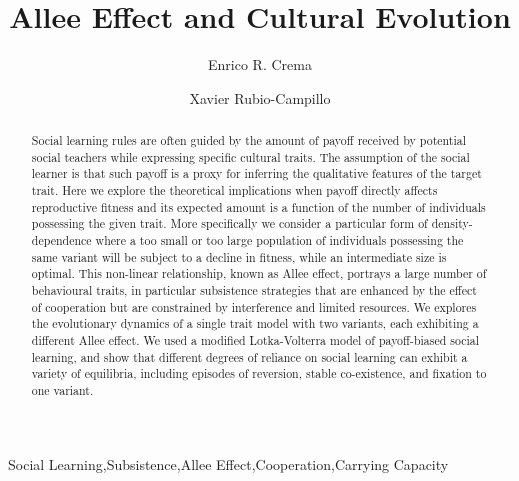 \documentclass[3p,authoryear,twocolumn]{elsarticle} %
\begin{document}
\begin{frontmatter}

\title{Allee Effect and Cultural Evolution}


\author[label1,label2]{Enrico R. Crema}
\author[label3]{Xavier Rubio-Campillo}

\address[label1]{CaSEs - Complexity and Socio-Ecological Dynamics Research Group, Barcelona}
\address[label2]{UCL Institute of Archaeology}
\address[label3]{BSC - Barcelona Supercomputing Center}



\begin{abstract}
Social learning rules are often guided by the amount of payoff received by potential social teachers while expressing specific cultural traits. The assumption of the social learner is that such payoff is a proxy for inferring the qualitative features of the target trait. Here we explore the theoretical implications when payoff directly affects  reproductive fitness and its expected amount is a function of the number of individuals possessing the given trait. More specifically we consider a particular form of density-dependence where a too small or too large population of individuals possessing the same variant will be subject to a decline in fitness, while an intermediate size is optimal. This non-linear relationship, known as Allee effect, portrays a large number of behavioural traits, in particular subsistence strategies that are enhanced  by the effect of cooperation but are constrained by interference and limited resources. We  explores the evolutionary dynamics of a single trait model  with two variants, each exhibiting a different Allee effect. We used a modified Lotka-Volterra model of payoff-biased social learning, and show that different degrees of reliance on social learning can exhibit a variety of equilibria, including episodes of reversion, stable co-existence, and fixation to one variant.


\end{abstract}

\begin{keyword}
Social Learning\sep Subsistence\sep Allee Effect\sep Cooperation\sep Carrying Capacity
\end{keyword}

\end{frontmatter}
\end{document}
